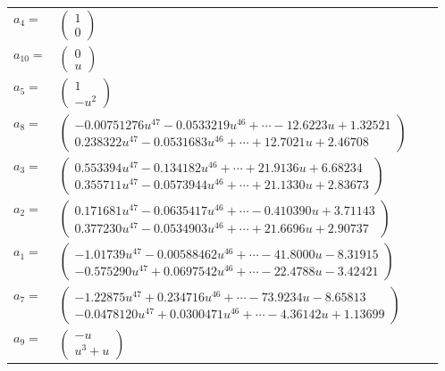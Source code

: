 \documentclass[1p]{elsarticle_modified}
\theoremstyle{definition}
\begin{document}
\begin{tabular}{m{7pt} m{180pt} m{7pt} m{180pt} }
\flushright $a_{4}=$&$\begin{pmatrix}1\\0\end{pmatrix}$ \\
\flushright $a_{10}=$&$\begin{pmatrix}0\\u\end{pmatrix}$ \\
\flushright $a_{5}=$&$\begin{pmatrix}1\\- u^2\end{pmatrix}$ \\
\flushright $a_{8}=$&$\begin{pmatrix}-0.00751276 u^{47}-0.0533219 u^{46}+\cdots-12.6223 u+1.32521\\0.238322 u^{47}-0.0531683 u^{46}+\cdots+12.7021 u+2.46708\end{pmatrix}$ \\
\flushright $a_{3}=$&$\begin{pmatrix}0.553394 u^{47}-0.134182 u^{46}+\cdots+21.9136 u+6.68234\\0.355711 u^{47}-0.0573944 u^{46}+\cdots+21.1330 u+2.83673\end{pmatrix}$ \\
\flushright $a_{2}=$&$\begin{pmatrix}0.171681 u^{47}-0.0635417 u^{46}+\cdots-0.410390 u+3.71143\\0.377230 u^{47}-0.0534903 u^{46}+\cdots+21.6696 u+2.90737\end{pmatrix}$ \\
\flushright $a_{1}=$&$\begin{pmatrix}-1.01739 u^{47}-0.00588462 u^{46}+\cdots-41.8000 u-8.31915\\-0.575290 u^{47}+0.0697542 u^{46}+\cdots-22.4788 u-3.42421\end{pmatrix}$ \\
\flushright $a_{7}=$&$\begin{pmatrix}-1.22875 u^{47}+0.234716 u^{46}+\cdots-73.9234 u-8.65813\\-0.0478120 u^{47}+0.0300471 u^{46}+\cdots-4.36142 u+1.13699\end{pmatrix}$ \\
\flushright $a_{9}=$&$\begin{pmatrix}- u\\u^3+u\end{pmatrix}$ \\

\end{tabular}
\end{document}
